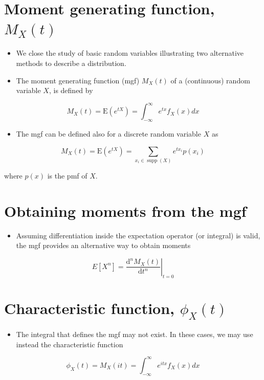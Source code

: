 \documentclass[10pt]{article}
\begin{document}
\section*{Moment generating function, $M_{X}(t)$}
\begin{itemize}
  \item We close the study of basic random variables illustrating two alternative methods to describe a distribution.
  \item The moment generating function (mgf) $M_{X}(t)$ of a (continuous) random variable $X$, is defined by
\end{itemize}

$$
M_{X}(t)=\mathrm{E}\left(e^{t X}\right)=\int_{-\infty}^{\infty} e^{t x} f_{X}(x) d x
$$

\begin{itemize}
  \item The mgf can be defined also for a discrete random variable $X$ as
\end{itemize}

$$
M_{X}(t)=\mathrm{E}\left(e^{t X}\right)=\sum_{x_{i} \in \operatorname{supp}(X)} e^{t x_{i}} p\left(x_{i}\right)
$$

where $p(x)$ is the pmf of $X$.

\section*{Obtaining moments from the mgf}
\begin{itemize}
  \item Assuming differentiation inside the expectation operator (or integral) is valid, the mgf provides an alternative way to obtain moments
\end{itemize}

$$
E\left[X^{n}\right]=\left.\frac{\mathrm{d}^{n} M_{X}(t)}{\mathrm{d} t^{n}}\right|_{t=0}
$$

\section*{Characteristic function, $\phi_{X}(t)$}
\begin{itemize}
  \item The integral that defines the mgf may not exist. In these cases, we may use instead the characteristic function
\end{itemize}

$$
\phi_{X}(t)=M_{X}(i t)=\int_{-\infty}^{\infty} e^{i t x} f_{X}(x) d x
$$
\end{document}
